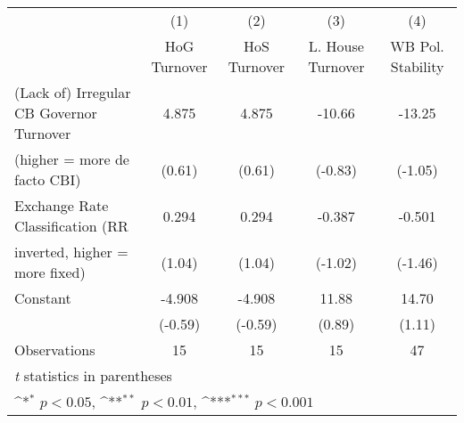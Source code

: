 \begin{table}[htbp]\centering
\def\sym#1{\ifmmode^{#1}\else\(^{#1}\)\fi}
\caption{\label{hoshogfivs4}}
\begin{tabular}{l*{4}{c}}
\toprule
                                        &\multicolumn{1}{c}{(1)}&\multicolumn{1}{c}{(2)}&\multicolumn{1}{c}{(3)}&\multicolumn{1}{c}{(4)}\\
                                        &\multicolumn{1}{c}{HoG Turnover}&\multicolumn{1}{c}{HoS Turnover}&\multicolumn{1}{c}{L. House Turnover}&\multicolumn{1}{c}{WB Pol. Stability}\\
\midrule
(Lack of) Irregular CB Governor Turnover&    4.875         &    4.875         &   -10.66         &   -13.25         \\
(higher = more de facto CBI)            &   (0.61)         &   (0.61)         &  (-0.83)         &  (-1.05)         \\
\addlinespace
Exchange Rate Classification (RR        &    0.294         &    0.294         &   -0.387         &   -0.501         \\
inverted, higher = more fixed)          &   (1.04)         &   (1.04)         &  (-1.02)         &  (-1.46)         \\
\addlinespace
Constant                                &   -4.908         &   -4.908         &    11.88         &    14.70         \\
                                        &  (-0.59)         &  (-0.59)         &   (0.89)         &   (1.11)         \\
\midrule
Observations                            &       15         &       15         &       15         &       47         \\
\bottomrule
\multicolumn{5}{l}{\footnotesize \textit{t} statistics in parentheses}\\
\multicolumn{5}{l}{\footnotesize \sym{*} \(p<0.05\), \sym{**} \(p<0.01\), \sym{***} \(p<0.001\)}\\
\end{tabular}
\end{table}
